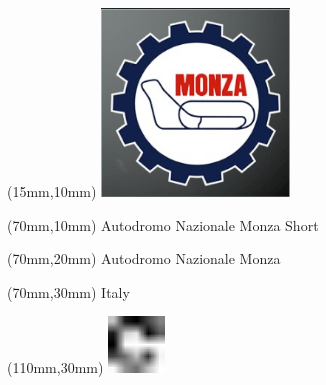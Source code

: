 \null\newpage
\begin{textblock*}{50mm}(15mm,10mm)%
\includegraphics[width=50mm]{LG/2015-05-20_00086.png}
\end{textblock*}
\begin{textblock*}{130mm}(70mm,10mm)%
{\fontsize{20}{20}\selectfont Autodromo Nazionale Monza Short}\\
\end{textblock*}
\begin{textblock*}{120mm}(70mm,20mm)%
{\fontsize{16}{16}\selectfont Autodromo Nazionale Monza}\\
\end{textblock*}
\begin{textblock*}{120mm}(70mm,30mm)%
{\fontsize{12}{12}\selectfont Italy}
\end{textblock*}
\begin{textblock*}{30mm}(110mm,30mm)%
\centering
\includegraphics[height=15mm]{icons/fa-rotate-right.pdf}
\end{textblock*}
